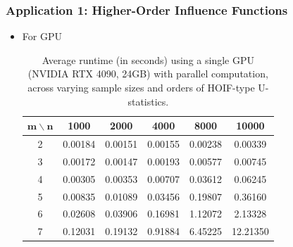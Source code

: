 \documentclass[9pt]{beamer}
\theoremstyle{mystyle}
\theoremstyle{mystyletwo}
\begin{document}
\begin{frame}
    \frametitle{Application 1: Higher-Order Influence Functions}
    \begin{itemize}
        \item For GPU
              \begin{table}[htbp]
                  \centering
                  \caption{Average runtime (in seconds) using a single GPU (NVIDIA RTX 4090, 24GB) with parallel computation, across varying sample sizes and orders of HOIF-type U-statistics.}
                  \label{tab:HOIF_GPU}
                  \begin{tabular}{cccccc}
                      \toprule
                      $\bm{m} \backslash \bm{n}$ & \textbf{1000} & \textbf{2000} & \textbf{4000} & \textbf{8000} & \textbf{10000} \\
                      \midrule
                      2                          & 0.00184       & 0.00151       & 0.00155       & 0.00238       & 0.00339        \\
                      3                          & 0.00172       & 0.00147       & 0.00193       & 0.00577       & 0.00745        \\
                      4                          & 0.00305       & 0.00353       & 0.00707       & 0.03612       & 0.06245        \\
                      5                          & 0.00835       & 0.01089       & 0.03456       & 0.19807       & 0.36160        \\
                      6                          & 0.02608       & 0.03906       & 0.16981       & 1.12072       & 2.13328        \\
                      7                          & 0.12031       & 0.19132       & 0.91884       & 6.45225       & 12.21350       \\
                      \bottomrule
                  \end{tabular}
              \end{table}
    \end{itemize}
\end{frame}
\end{document}
